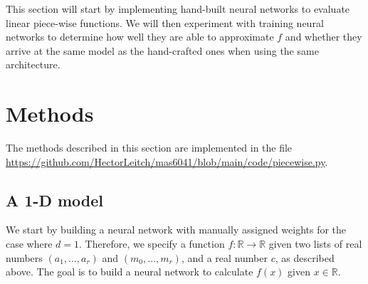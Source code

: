 \documentclass{somasmsc}
\begin{document}
This section will start by implementing hand-built neural networks to evaluate linear piece-wise functions. We will then experiment with training neural networks to determine how well they are able to approximate $f$ and whether they arrive at the same model as the hand-crafted ones when using the same architecture.

\section{Methods}

The methods described in this section are implemented in the file \url{https://github.com/HectorLeitch/mas6041/blob/main/code/piecewise.py}.

\subsection{A 1-D model}\label{piece:1d}

We start by building a neural network with manually assigned weights for the case where $d=1$. Therefore, we specify a function $f: \mathbb{R} \rightarrow \mathbb{R}$ given two lists of real numbers $\left(a_1, \dots, a_r\right)$ and $\left(m_0, \dots, m_r\right)$, and a real number $c$, as described above. The goal is to build a neural network to calculate $f\left(x\right)$ given $x \in \mathbb{R}$.
\end{document}
